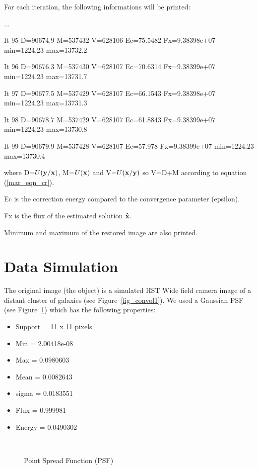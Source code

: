 For each iteration, the following informations will be printed:

...

It 95 D=90674.9 M=537432 V=628106 Ec=75.5482 Fx=9.38398e+07 min=1224.23 max=13732.2

It 96 D=90676.3 M=537430 V=628107 Ec=70.6314 Fx=9.38399e+07 min=1224.23 max=13731.7

It 97 D=90677.5 M=537429 V=628107 Ec=66.1543 Fx=9.38398e+07 min=1224.23 max=13731.3

It 98 D=90678.7 M=537429 V=628107 Ec=61.8843 Fx=9.38399e+07 min=1224.23 max=13730.8

It 99 D=90679.9 M=537428 V=628107 Ec=57.978 Fx=9.38399e+07 min=1224.23 max=13730.4
 
where D=$U({\bf y/x})$, M=$U({\bf x})$ and V=$U({\bf x/y})$ 
so V=D+M according to equation (\ref{mar_eqn_cr}). 

Ec is the correction energy compared
to the convergence parameter (epsilon).

Fx is the flux of the estimated
solution $\bf \hat x$.

Minimum and maximum of the restored image are also printed.

\newpage

\section{Data Simulation}

The original image (the object) is a simulated HST Wide field camera image of 
a distant cluster 
of galaxies (see Figure~\ref{fig_convol1}).
We used a Gaussian PSF (see Figure~\ref{fig_psf}) which has the following properties:
\begin{itemize}
\item{Support = 11 x 11 pixels}
\item{  Min = 2.00418e-08}   
\item{  Max = 0.0980603}
\item{  Mean = 0.0082643} 
\item{  sigma = 0.0183551}
\item{  Flux = 0.999981} 
\item{  Energy = 0.0490302}
\end{itemize}
\begin{figure}[htb]
\centerline{
\hbox{
}}
\caption{Point Spread Function (PSF)}
\label{fig_psf}
\end{figure}

